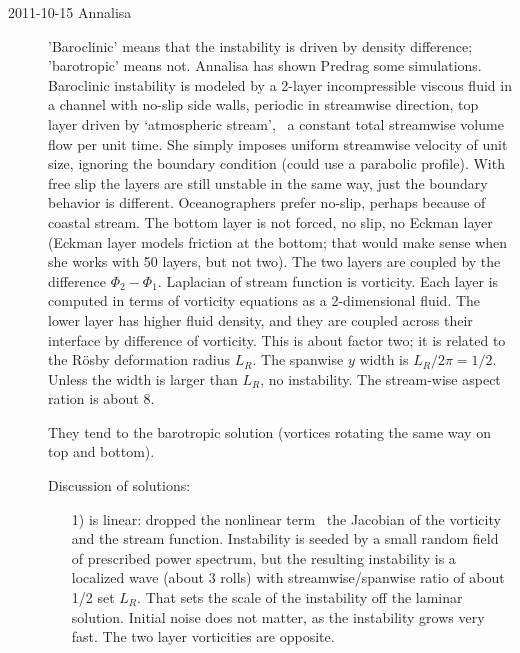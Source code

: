\begin{description}

\item[2011-10-15 Annalisa]
'Baroclinic' means that the instability is driven by density difference;
'barotropic' means not. Annalisa has shown Predrag some simulations.
Baroclinic instability is modeled by a 2-layer incompressible viscous
fluid in a channel with no-slip side walls, periodic in streamwise
direction, top layer driven by `atmospheric stream', \ie\ a constant
total streamwise volume flow per unit time. She simply imposes uniform
streamwise velocity of unit size, ignoring the boundary condition (could
use a parabolic profile). With free slip the layers are still unstable in
the same way, just the boundary behavior is different. Oceanographers
prefer no-slip, perhaps because of coastal stream. The bottom layer is
not forced, no slip, no Eckman layer (Eckman layer models friction at the
bottom; that would make sense when she works with 50 layers, but not
two). The two layers are coupled by the difference $\Phi_2 - \Phi_1$.
Laplacian of stream function is vorticity. Each layer is computed in
terms of vorticity equations as a 2-dimensional fluid. The lower layer
has higher fluid density, and they are coupled across their interface by
difference of vorticity. This is about factor two; it is related to the
R\"osby deformation radius $L_R$. The spanwise $y$ width is $L_R/2\pi =
1/2$. Unless the width is larger than $L_R$, no instability. The
stream-wise aspect ration is about 8.

They tend to the barotropic solution (vortices rotating the same way on
top and bottom).


Discussion of solutions:
\begin{enumerate}
  \item [1)]
is linear: dropped the nonlinear term \ie\ the Jacobian of the vorticity
and the stream function. Instability is seeded by a small random field of
prescribed power spectrum, but the resulting instability is a localized
wave (about 3 rolls) with streamwise/spanwise ratio of about 1/2 set
$L_R$. That sets the scale of the instability off the laminar solution.
Initial noise does not matter, as the instability grows very fast. The
two layer vorticities are opposite.


\end{enumerate}
\end{description}
